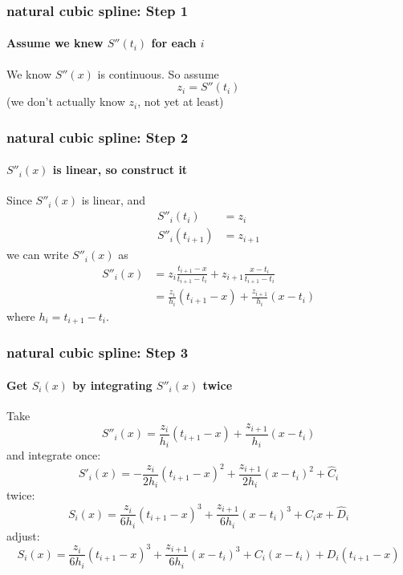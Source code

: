 \documentclass[10pt]{beamer}
\begin{document}
\begin{frame}
\frametitle{natural cubic spline: Step 1}
\framesubtitle{Assume we knew $S''(t_i)$ for each $i$}
We know $S''(x)$ is continuous. So assume
\begin{equation*}
  z_i = S''(t_i) 
\end{equation*}
(we don't actually know $z_i$, not yet at least)
\end{frame}
\begin{frame}
\frametitle{natural cubic spline: Step 2}
\framesubtitle{$S''_i(x)$ is linear, so construct it}
Since $S''_i(x)$ is linear, and
\begin{align*}
  S''_i(t_i)&=z_i\\
  S''_i(t_{i+1})&=z_{i+1}
\end{align*}
we can write $S''_i(x)$ as
\begin{align*}
  S''_i(x) & = z_i     \frac{t_{i+1}-x}{t_{i+1}-t_{i}} + 
               z_{i+1} \frac{x-t_{i}}{t_{i+1}-t_{i}}\\
           & = \frac{z_i}{h_i}(t_{i+1}-x) +\frac{z_{i+1}}{h_i}(x-t_i)
\end{align*}
where $h_i = t_{i+1} - t_i$.

\end{frame}
\begin{frame}
\frametitle{natural cubic spline: Step 3}
\framesubtitle{Get $S_i(x)$ by integrating $S''_i(x)$ twice}
Take
\begin{equation*}
  S''_i(x) = \frac{z_i}{h_i}(t_{i+1}-x) +\frac{z_{i+1}}{h_i}(x-t_i)
\end{equation*}
and integrate once:
\begin{equation*}
  S'_i(x) = -\frac{z_i}{2h_i}(t_{i+1}-x)^2
+\frac{z_{i+1}}{2h_i}(x-t_i)^2 + \hat{C}_i
\end{equation*}
twice:
\begin{equation*}
  S_i(x) = \frac{z_i}{6h_i}(t_{i+1}-x)^3
+\frac{z_{i+1}}{6h_i}(x-t_i)^3 + \hat{C}_ix + \hat{D}_i
\end{equation*}
adjust:
\begin{equation*}
  S_i(x) = \frac{z_i}{6h_i}(t_{i+1}-x)^3
+\frac{z_{i+1}}{6h_i}(x-t_i)^3 + C_i(x-t_i) + D_i(t_{i+1}-x)
\end{equation*}
\end{frame}
\end{document}
